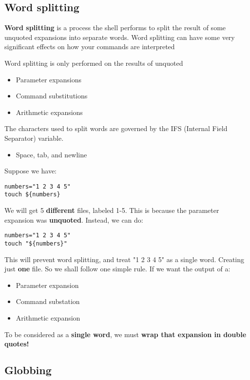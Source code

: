\documentclass{report}
\begin{document}
  \pagebreak \bigbreak \noindent 
  \subsection{Word splitting}
  \bigbreak \noindent 
  \begin{concept}
     \textbf{Word splitting}  is a process the shell performs to split the result of some unquoted expansions into separate words. Word splitting can have some very significant effects on how your commands are interpreted
  \end{concept}
  \bigbreak \noindent 
  Word splitting is only performed on the results of unquoted 
  \begin{itemize}
      \item Parameter expansions
        \item Command substitutions
        \item Arithmetic expansions
  \end{itemize}
  \bigbreak \noindent 
  The characters used to split words are governed by the IFS (Internal Field Separator) variable.
  \begin{itemize}
      \item Space, tab, and newline
  \end{itemize}
  \bigbreak \noindent 
  Suppose we have:
  \begin{mdframed}[style=purplebox]
  \begin{verbatim}
numbers="1 2 3 4 5"
touch ${numbers}
  \end{verbatim}
  \bigbreak \noindent
  \end{mdframed}
  \bigbreak \noindent 
  We will get 5 \textbf{different} files, labeled 1-5. This is because the parameter expansion was \textbf{unquoted}. Instead, we can do:
  \begin{mdframed}[style=purplebox]
  \begin{verbatim}
numbers="1 2 3 4 5"
touch "${numbers}"
  \end{verbatim}
  \bigbreak \noindent
  \end{mdframed}
  \bigbreak \noindent 
  This will prevent word splitting, and treat "1 2 3 4 5" as a single word. Creating just \textbf{one} file.
  \bigbreak \noindent 
  So we shall follow one simple rule. If we want the output of a:
  \begin{itemize}
      \item Parameter expansion 
        \item Command substation
        \item Arithmetic expansion
  \end{itemize}
  \bigbreak \noindent 
  To be considered as a \textbf{single word}, we must \textbf{wrap that expansion in double quotes!}

  \pagebreak \bigbreak \noindent 
  \subsection{Globbing}
  \bigbreak \noindent 




  




    

    





    
\end{document}
